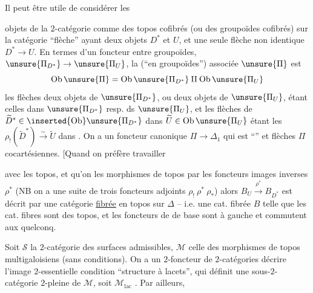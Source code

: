 Il peut être utile de considérer les

objets de la $2$-catégorie comme des topos cofibrés (ou des groupoïdes cofibrés) sur la catégorie ``flèche''
ayant deux objets $D^*$ et $U$, et une seule flèche non identique $D^*\to U$. En termes d'un foncteur entre groupoïdes, $\unsure{\Pi_{D^*}}\to\unsure{\Pi_U}$, la   (``en groupoïdes'') associée $\unsure{\Pi}$ est   
\[
\mathrm{Ob}\,\unsure{\Pi}=\mathrm{Ob}\,\unsure{\Pi_{D^*}}\amalg\mathrm{Ob}\,\unsure{\Pi_U}
\]
les flèches   deux objets de $\unsure{\Pi_{D^*}}$, ou deux objets de $\unsure{\Pi_U}$, étant celles dans $\unsure{\Pi_{D^*}}$ resp. ds $\unsure{\Pi_U}$, et les flèches de $\widetilde D^*\in\inserted{\mathrm{Ob}}\unsure{\Pi_{D^*}}$ dans $\widetilde U\in\mathrm{Ob}\,\unsure{\Pi_U}$ étant les  $\rho_!(\widetilde D^*)\xrightarrow{\sim}\widetilde U$ dans .  On a un foncteur canonique $\Pi\to\Delta_1$ qui est ``'' et    flèches  $\Pi$ cocartésiennes. [Quand on préfère travailler

avec les topos, et qu'on  les morphismes de topos par les foncteurs images inverses $\rho^*$ (NB on a une suite de trois foncteurs adjoints $\rho_!\ \rho^*\ \rho_*$) alors $B_U\xrightarrow{\rho^*}B_{D^*}$ est décrit par une catégorie  \uline{fibrée} en topos sur $\Delta$ -- i.e. une cat. fibrée $B$ telle que les cat. fibres sont des topos, et les foncteurs de  de base sont  à gauche et commutent aux \unsure{$\underset{\longrightarrow}{\lim}$} quelconq.

Soit $\mathcal S$ la $2$-catégorie des surfaces admissibles, $\mathcal M$ celle des morphismes de topos multigaloisiens (sans conditions). On a un $2$-foncteur de $2$-catégories
 décrire l'image $2$-essentielle  condition ``structure à lacets'',  qui définit une sous-$2$-catégorie $2$-pleine de $\mathcal M$, soit $\mathcal M_{\mathrm{lac}}$ . Par ailleurs,

